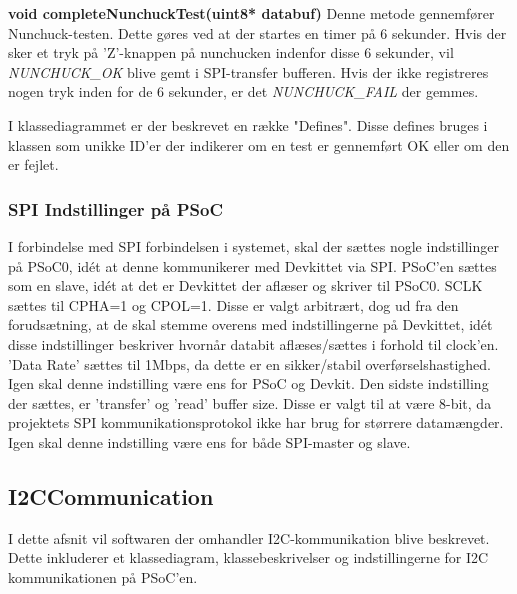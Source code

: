 \noindent\textbf{void completeNunchuckTest(uint8* databuf)} \newline
Denne metode gennemfører Nunchuck-testen. Dette gøres ved at der startes en timer på 6 sekunder. Hvis der sker et tryk på 'Z'-knappen på nunchucken indenfor disse 6 sekunder, vil \textit{NUNCHUCK\_OK} blive gemt i SPI-transfer bufferen. Hvis der ikke registreres nogen tryk inden for de 6 sekunder, er det \textit{NUNCHUCK\_FAIL} der gemmes.\newline

I klassediagrammet er der beskrevet en række "Defines". Disse defines bruges i klassen som unikke ID'er der indikerer om en test er gennemført OK eller om den er fejlet.

\subsubsection{SPI Indstillinger på PSoC}
I forbindelse med SPI forbindelsen i systemet, skal der sættes nogle indstillinger på PSoC0, idét at denne kommunikerer med Devkittet via SPI. 
PSoC'en sættes som en slave, idét at det er Devkittet der aflæser og skriver til PSoC0.
SCLK sættes til CPHA=1 og CPOL=1. Disse er valgt arbitrært, dog ud fra den forudsætning, at de skal stemme overens med indstillingerne på Devkittet, idét disse indstillinger beskriver hvornår databit aflæses/sættes i forhold til clock'en. 
'Data Rate' sættes til 1Mbps, da dette er en sikker/stabil overførselshastighed. Igen skal denne indstilling være ens for PSoC og Devkit.
Den sidste indstilling der sættes, er 'transfer' og 'read' buffer size. Disse er valgt til at være 8-bit, da projektets SPI kommunikationsprotokol ikke har brug for størrere datamængder. Igen skal denne indstilling være ens for både SPI-master og slave. 

\subsection{I2CCommunication}
I dette afsnit vil softwaren der omhandler I2C-kommunikation blive beskrevet. Dette inkluderer et klassediagram,  klassebeskrivelser og indstillingerne for I2C kommunikationen på PSoC'en.

